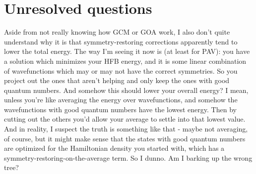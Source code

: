 \section*{Unresolved questions}
Aside from not really knowing how GCM or GOA work, I also don't quite understand why it is that symmetry-restoring corrections apparently tend to lower the total energy. The way I'm seeing it now is (at least for PAV): you have a solution which minimizes your HFB energy, and it is some linear combination of wavefunctions which may or may not have the correct symmetries. So you project out the ones that aren't helping and only keep the ones with good quantum numbers. And somehow this should lower your overall energy? I mean, unless you're like averaging the energy over wavefunctions, and somehow the wavefunctions with good quantum numbers have the lowest energy. Then by cutting out the others you'd allow your average to settle into that lowest value. And in reality, I suspect the truth is something like that - maybe not averaging, of course, but it might make sense that the states with good quantum numbers are optimized for the Hamiltonian density you started with, which has a symmetry-restoring-on-the-average term. So I dunno. Am I barking up the wrong tree?